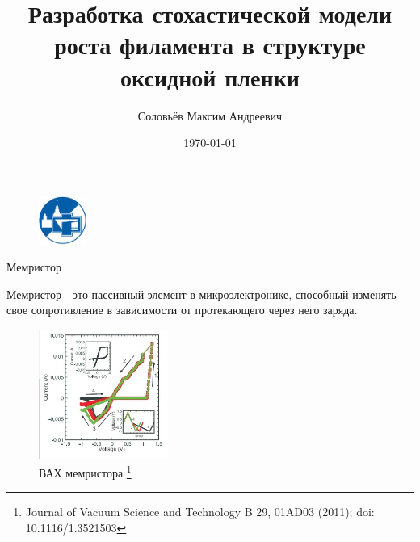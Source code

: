 \documentclass{beamer}%
\begin{document}

\title{Разработка стохастической модели роста филамента в структуре оксидной пленки}
\author{Соловьёв Максим Андреевич}
\date{\today}



\begin{frame}%
\begin{figure}
    \centering
    \includegraphics[width=60px]{img/ff-sign.png}
\end{figure}
\maketitle
\end{frame}

\begin{frame}{Мемристор}
\begin{multicols}{2}
Мемристор - это пассивный элемент в микроэлектронике, способный изменять свое сопротивление в зависимости от протекающего через него заряда. 

\columnbreak
    \begin{figure}
        \centering
        \includegraphics[width=160px]{img/vac_memrister.jpg}
        \caption{ВАХ мемристора%
    \footnote{%
    Journal of Vacuum Science and Technology B 29, 01AD03 (2011); doi: 10.1116/1.3521503
    }%
    }
    \end{figure}
\end {multicols}
\end{frame}
\end{document}
